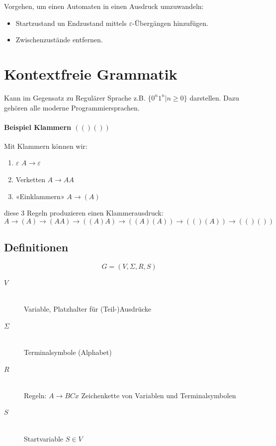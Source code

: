 Vorgehen, um einen Automaten in einen Ausdruck umzuwandeln:

\begin{itemize}
	\item Startzustand un Endzustand mittels $\varepsilon$-Übergängen hinzufügen.
	\item Zwischenzustände entfernen.
\end{itemize}

\section{Kontextfreie Grammatik}


Kann im Gegensatz zu Regulärer Sprache z.B. $\{0^n1^n | n \geq 0 \}$ darstellen. Dazu gehören alle moderne Programmiersprachen.

\paragraph{Beispiel Klammern $(()())$}

Mit Klammern können wir:

\begin{enumerate}
	\item $\varepsilon$ \hfill $A \to \varepsilon$
	\item Verketten \hfill $A \to AA$
	\item «Einklammern» \hfill $A \to (A)$
\end{enumerate}

diese 3 Regeln produzieren einen Klammerausdruck:
\[
	A \to (A) \to (AA) \to ((A)A) \to ((A)(A)) \to (()(A)) \to (()())
\]

\subsection{Definitionen}

\[
	G = (V, \Sigma, R, S)
\]

\begin{description}
	\item[$V$] \hfill \\
		Variable, Platzhalter für (Teil-)Ausdrücke
	\item[$\Sigma$] \hfill \\
		Terminalsymbole (Alphabet)
	\item[$R$] \hfill \\
		Regeln: $A \to BCx$ Zeichenkette von Variablen und Terminalsymbolen
	\item[$S$] \hfill \\
		Startvariable $S \in V$
\end{description}

